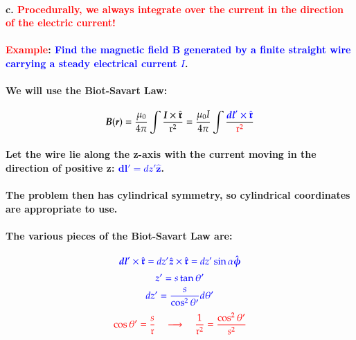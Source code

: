 \documentclass{article}
\begin{document}
\paragraph{\indent c. \textcolor{red}{Procedurally, we always integrate over the current in the direction of the electric current!}}
\paragraph{\textcolor{red}{Example}: \textcolor{blue}{Find the magnetic field $\boldsymbol{B}$ generated by a finite straight wire carrying a steady electrical current $I$}.}
\paragraph{We will use the Biot-Savart Law:}
\begin{equation*}
    \boldsymbol{B}(\boldsymbol{r})=\frac{\mu_0}{4\pi}\int\frac{\boldsymbol{I}\times\hat{\boldsymbol{\mathfrak{r}}}}{\mathfrak{r}^2}=\frac{\mu_0I}{4\pi}\int\frac{\textcolor{blue}{\boldsymbol{dl}'\times\hat{\boldsymbol{\mathfrak{r}}}}}{\textcolor{red}{\mathfrak{r}^2}}
\end{equation*}
\paragraph{Let the wire lie along the z-axis with the current moving in the direction of positive z: \textcolor{blue}{$\boldsymbol{dl}'=dz'\hat{\boldsymbol{z}}$}.}
\paragraph{The problem then has cylindrical symmetry, so cylindrical coordinates are appropriate to use.}
\paragraph{The various pieces of the Biot-Savart Law are:}
\begin{equation*}
    \textcolor{blue}{\boldsymbol{dl}'\times \hat{\boldsymbol{\mathfrak{r}}}=dz'\hat{\boldsymbol{z}}\times\hat{\boldsymbol{\mathfrak{r}}}=dz'\sin\alpha\hat{\boldsymbol{\phi}} }
\end{equation*}
\begin{equation*}
    \textcolor{blue}{z'=s\tan\theta'}
\end{equation*}
\begin{equation*}
    \textcolor{blue}{dz'=\frac{s}{\cos^2\theta'} d\theta'}
\end{equation*}
\begin{equation*}
    \textcolor{red}{\cos\theta'=\frac{s}{\mathfrak{r}} \quad\longrightarrow\quad \frac{1}{\mathfrak{r}^2}=\frac{\cos^2\theta'}{s^2}}
\end{equation*}
\end{document}
